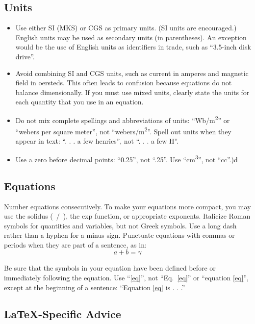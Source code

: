 \documentclass[conference]{IEEEtran}
\begin{document}
\subsection{Units}
\begin{itemize}
\item Use either SI (MKS) or CGS as primary units. (SI units are encouraged.) English units may be used as secondary units (in parentheses). An exception would be the use of English units as identifiers in trade, such as ``3.5-inch disk drive''.
\item Avoid combining SI and CGS units, such as current in amperes and magnetic field in oersteds. This often leads to confusion because equations do not balance dimensionally. If you must use mixed units, clearly state the units for each quantity that you use in an equation.
\item Do not mix complete spellings and abbreviations of units: ``Wb/m\textsuperscript{2}'' or ``webers per square meter'', not ``webers/m\textsuperscript{2}''. Spell out units when they appear in text: ``. . . a few henries'', not ``. . . a few H''.
\item Use a zero before decimal points: ``0.25'', not ``.25''. Use ``cm\textsuperscript{3}'', not ``cc''.)d
\end{itemize}

\subsection{Equations}
Number equations consecutively. To make your 
equations more compact, you may use the solidus (~/~), the exp function, or 
appropriate exponents. Italicize Roman symbols for quantities and variables, 
but not Greek symbols. Use a long dash rather than a hyphen for a minus 
sign. Punctuate equations with commas or periods when they are part of a 
sentence, as in:
\begin{equation}
a+b=\gamma\label{eq}
\end{equation}

Be sure that the 
symbols in your equation have been defined before or immediately following 
the equation. Use ``\eqref{eq}'', not ``Eq.~\eqref{eq}'' or ``equation \eqref{eq}'', except at 
the beginning of a sentence: ``Equation \eqref{eq} is . . .''

\subsection{\LaTeX-Specific Advice}
\end{document}
